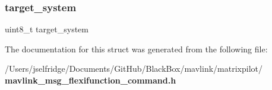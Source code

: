\mbox{\label{struct____mavlink__flexifunction__command__t_ac9afff43526a157e4c4e45607c1418b8}} 
\subsubsection{target\+\_\+system}
{\footnotesize\ttfamily uint8\+\_\+t target\+\_\+system}



The documentation for this struct was generated from the following file\+:\begin{DoxyCompactItemize}
\item 
/\+Users/jselfridge/\+Documents/\+Git\+Hub/\+Black\+Box/mavlink/matrixpilot/\textbf{ mavlink\+\_\+msg\+\_\+flexifunction\+\_\+command.\+h}\end{DoxyCompactItemize}
